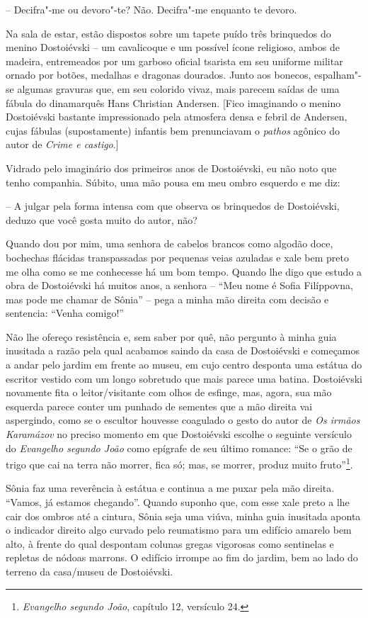 -- Decifra"-me ou devoro"-te? Não. Decifra"-me enquanto te devoro.

Na sala de estar, estão dispostos sobre um tapete puído três brinquedos
do menino Dostoiévski -- um cavalicoque e um possível ícone religioso,
ambos de madeira, entremeados por um garboso oficial tsarista em seu
uniforme militar ornado por botões, medalhas e dragonas dourados. Junto
aos bonecos, espalham"-se algumas gravuras que, em seu colorido vivaz,
mais parecem saídas de uma fábula do dinamarquês Hans Christian
Andersen. {[}Fico imaginando o menino Dostoiévski bastante impressionado
pela atmosfera densa e febril de Andersen, cujas fábulas (supostamente)
infantis bem prenunciavam o \emph{pathos} agônico do autor de
\emph{Crime e castigo}.{]}

Vidrado pelo imaginário dos primeiros anos de Dostoiévski, eu não noto
que tenho companhia. Súbito, uma mão pousa em meu ombro esquerdo e me
diz:

-- A julgar pela forma intensa com que observa os brinquedos de
Dostoiévski, deduzo que você gosta muito do autor, não?

Quando dou por mim, uma senhora de cabelos brancos como algodão doce,
bochechas flácidas transpassadas por pequenas veias azuladas e xale bem
preto me olha como se me conhecesse há um bom tempo. Quando lhe digo que
estudo a obra de Dostoiévski há muitos anos, a senhora -- ``Meu nome é
Sofia Filíppovna, mas pode me chamar de Sônia'' -- pega a minha mão
direita com decisão e sentencia: ``Venha comigo!''

Não lhe ofereço resistência e, sem saber por quê, não pergunto à minha
guia inusitada a razão pela qual acabamos saindo da casa de Dostoiévski
e começamos a andar pelo jardim em frente ao museu, em cujo centro
desponta uma estátua do escritor vestido com um longo sobretudo que mais
parece uma batina. Dostoiévski novamente fita o leitor/visitante com
olhos de esfinge, mas, agora, sua mão esquerda parece conter um punhado
de sementes que a mão direita vai aspergindo, como se o escultor
houvesse coagulado o gesto do autor de \emph{Os irmãos Karamázov} no
preciso momento em que Dostoiévski escolhe o seguinte versículo do
\emph{Evangelho segundo João} como epígrafe de seu último romance: ``Se
o grão de trigo que cai na terra não morrer, fica só; mas, se morrer,
produz muito fruto''\footnote{\emph{Evangelho segundo João}, capítulo
  12, versículo 24.}.

Sônia faz uma reverência à estátua e continua a me puxar pela mão
direita. ``Vamos, já estamos chegando''. Quando suponho que, com esse
xale preto a lhe cair dos ombros até a cintura, Sônia seja uma viúva,
minha guia inusitada aponta o indicador direito algo curvado pelo
reumatismo para um edifício amarelo bem alto, à frente do qual despontam
colunas gregas vigorosas como sentinelas e repletas de nódoas marrons. O
edifício irrompe ao fim do jardim, bem ao lado do terreno da casa/museu
de Dostoiévski.

